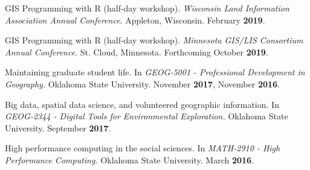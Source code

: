 \begin{cventries}

  \cventry
  {}
  {}
  {}
  {}
  {
    \begin{cvitems}
      \vspace{-3mm}
    \item {GIS Programming with R (half-day workshop). \textit{Wisconsin Land
          Information Association Annual Conference}. Appleton, Wisconsin. February \textbf{2019}.}
    \end{cvitems}
  } %

  \cventry
  {}
  {}
  {}
  {}
  {
    \begin{cvitems}
      \vspace{-3mm}
    \item {GIS Programming with R (half-day workshop). \textit{Minnesota GIS/LIS
          Consortium Annual Conference}. St. Cloud, Minnesota. Forthcoming
        October \textbf{2019}.}
    \end{cvitems}
  } %


  \cventry
    {}
    {}
    {}
    {}
    {
       \begin{cvitems}
          \vspace{-3mm}
        \item {Maintaining graduate student life. In \textit{GEOG-5001 -
              Professional Development in Geography.} Oklahoma State University.
            November \textbf{2017}, November \textbf{2016}.}
          \end{cvitems}
        } %

  \cventry
    {}
    {}
    {}
    {}
    {
      \begin{cvitems}
        \vspace{-3mm}
      \item {Big data, spatial data science, and volunteered geographic
          information. In \textit{GEOG-2344 - Digital Tools for Environmental
            Exploration.} Oklahoma State University. September \textbf{2017}}.
        \end{cvitems}
    }

  \cventry
    {}
    {}
    {}
    {}
    {
       \begin{cvitems}
         \vspace{-3mm}
       \item {High performance computing in the social sciences. In
           \textit{MATH-2910 - High Performance Computing.} Oklahoma State
           University. March \textbf{2016}.}
          \end{cvitems}
        } %
          

\end{cventries}
